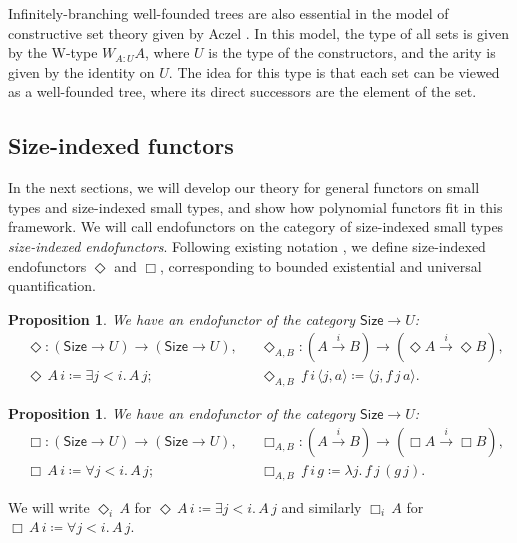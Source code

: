 \documentclass[10pt,a4paper]{article}
\newtheorem{proposition}[theorem]{Proposition}
\theoremstyle{definition}
\theoremstyle{remark}
\renewcommand{\.}{.\,} %
\renewcommand{\:}{:} %
\newcommand{\brac}[1]{\langle {#1} \rangle }
\newcommand{\Size}{\mathsf{Size}}
\newcommand{\0}{\mathbf{0}}
\newcommand{\1}{\mathbf{1}}
\newcommand\<\langle
\renewcommand\>\rangle
\newcommand{\U}{U}
\theoremstyle{remark}
\begin{document}
Infinitely-branching well-founded trees are also essential in the model of constructive set theory given by Aczel \cite{ACZEL197855}. In this model, the type of all sets is given by the W-type \(W_{A : U} A\), where $U$ is the type of the constructors, and the arity is given by the identity on $U$. The idea for this type is that each set can be viewed as a well-founded tree, where its direct successors are the element of the set. 

\subsection{Size-indexed functors}
In the next sections, we will develop our theory for general functors on small types and size-indexed small types, and show how polynomial functors fit in this framework.
We will call endofunctors on the category of size-indexed small types \emph{size-indexed endofunctors}.
Following existing notation \cite{parametric-quantifier, licentiate}, we define size-indexed endofunctors $\Diamond$ and $\Box$, corresponding to bounded existential and universal quantification.
\begin{proposition}
    We have an endofunctor of the category \(\Size\to U\): 
    \begin{align*}
        &\Diamond : (\Size \to \U) \to (\Size \to \U), &
        &\Diamond_{A,B}:(A \overset{i}{\to} B) \to (\Diamond A \overset{i}{\to} \Diamond B), \\
        &\Diamond \, A  \, i \coloneq   \exists j < i\. A \, j; &
        &\Diamond_{A, B} \, f \, i \, \langle j, a \rangle \coloneq  \brac{j, f \, j \, a}.
    \end{align*}
\end{proposition}

\begin{proposition}
    We have an endofunctor of the category \(\Size\to U\):  
    \begin{align*}
        &\Box : (\Size \to \U) \to (\Size \to \U), &
        &\Box_{A,B} : (A \overset{i}{\to} B) \to (\Box A \overset{i}{\to} \Box B), \\
        &\Box \, A  \, i \coloneq  \forall j < i \. A \, j; &
        &\Box_{A , B} \, f \, i \, g \coloneq  \lambda j \. f \, j \, (g \, j).
    \end{align*}
\end{proposition}
We will write $\Diamond_i \, A$ for $\Diamond \, A \, i \coloneq  \exists j < i \. A \, j$ and similarly $\Box_i \, A$ for $\Box \,  A \, i \coloneq  \forall j < i\. A \, j$.
\end{document}
